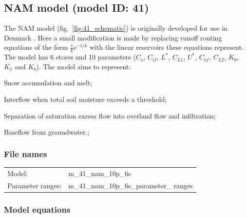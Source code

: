 \subsection{NAM model (model ID: 41)}
The NAM model (fig.~\ref{fig:41_schematic}) is originally developed for use in Denmark \citep{Nielsen1973}. Here a small modification is made by replacing runoff routing equations of the form $\frac{1}{k}e^{-t/k}$ with the linear reservoirs these equations represent. The model has 6 stores and 10 parameters ($C_s$, $C_{if}$, $L^*$, $C_{L1}$, $U^*$, $C_{of}$, $C_{L2}$, $K_0$, $K_1$ and $K_b$). The model aims to represent:

\begin{itemizecompact}
\item Snow accumulation and melt;
\item Interflow when total soil moisture exceeds a threshold;
\item Separation of saturation excess flow into overland flow and infiltration;
\item Baseflow from groundwater.;
\end{itemizecompact}

\subsubsection{File names}
\begin{tabular}{@{}ll}
Model: &m\_41\_nam\_10p\_6s \\
Parameter ranges: &m\_41\_nam\_10p\_6s\_parameter\_ ranges \\
\end{tabular}

\subsubsection{Model equations}

